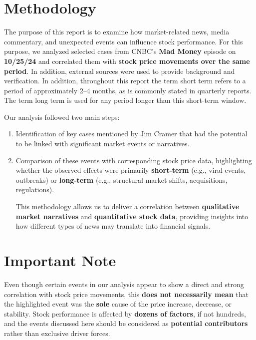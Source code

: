 \documentclass[12pt,a4paper]{article}
\begin{document}
\section*{Methodology}
The purpose of this report is to examine how market-related news, media commentary, 
and unexpected events can influence stock performance. 
For this purpose, we analyzed selected cases from CNBC's \textbf{Mad Money} episode 
on \textbf{10/25/24} and correlated them with \textbf{stock price movements over the same period}. 
In addition, external sources were used to provide background and verification. In addition, throughout this report the term short term refers to a period of approximately 2–4 months, as is commonly stated in quarterly reports. The term long term is used for any period longer than this short-term window. 

\newpage
Our analysis followed two main steps:
\begin{enumerate}
    \item Identification of key cases mentioned by Jim Cramer that had the potential 
    to be linked with significant market events or narratives.
    \item Comparison of these events with corresponding stock price data, 
    highlighting whether the observed effects were primarily \textbf{short-term} (e.g., viral events, outbreaks) 
    or \textbf{long-term} (e.g., structural market shifts, acquisitions, regulations).
    
    This methodology allows us to deliver a correlation between 
\textbf{qualitative market narratives} and \textbf{quantitative stock data}, 
providing insights into how different types of news may translate into 
financial signals.
\end{enumerate}

\vspace{0.3cm}
\section*{Important Note}
Even though certain events in our analysis appear to show a direct and strong correlation 
with stock price movements, this \textbf{does not necessarily mean} that the highlighted event 
was the \textbf{sole} cause of the price increase, decrease, or stability. 
Stock performance is affected by \textbf{dozens of factors}, if not hundreds, and the events discussed here
should be considered as \textbf{potential contributors} rather than exclusive driver forces.
\vspace{1.1cm}
\end{document}
